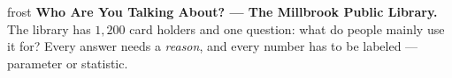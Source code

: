 \documentclass[10pt]{article}
\begin{document}

\vspace{0.15in}

\begin{headlinebox}{frost}
\small
\textbf{Who Are You Talking About? --- The Millbrook Public Library.} The library
has $1{,}200$ card holders and one question: what do people mainly use it for?
Every answer needs a \emph{reason}, and every number has to be labeled ---
parameter or statistic.
\end{headlinebox}

\vspace{0.1in}
\end{document}

